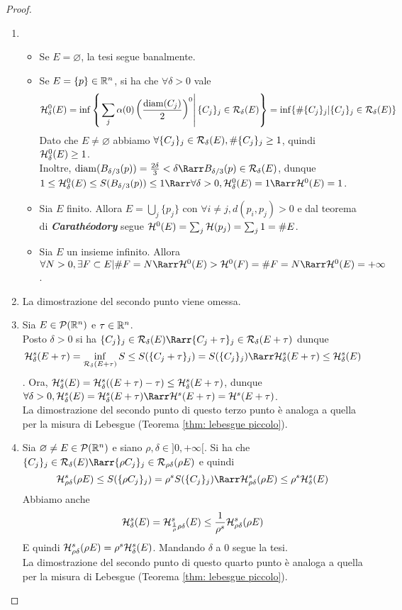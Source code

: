 \begin{proof}~
  \begin{enumerate}
      \item \begin{itemize}
          \item Se $E = \varnothing$, la tesi segue banalmente.
          \item Se $E = \{p\} \in \mathbb{R}^n$, si ha che $\forall \delta > 0$ vale \[\mathcal{H}_\delta^0(E) = \inf\left\{\left.\sum_j \alpha(0)\left(\frac{\operatorname{diam}(C_j)}{2}\right)^0\right|\{C_j\}_j \in \mathcal{R}_\delta(E)\right\} = \inf\{\#\{C_j\}_j |\{C_j\}_j \in \mathcal{R}_\delta(E)\}\] Dato che $E \neq \varnothing$ abbiamo $\forall \{C_j\}_j \in \mathcal{R}_\delta(E),\#\{C_j\}_j \geq 1$, quindi $\mathcal{H}_\delta^0(E) \geq 1$.\\ Inoltre, $\operatorname{diam}(B_{\delta/3}(p)) = \frac{2\delta}{3}<\delta \Rarr B_{\delta/3}(p) \in \mc R_\delta(E)$, dunque $1 \leq \mc H_\delta^0(E) \leq S(B_{\delta/3}(p)) \leq 1 \Rarr \forall \delta > 0 , \mc H_\delta^0(E) = 1 \Rarr \mc H^0(E) = 1$.
          \item Sia $E$ finito. Allora $E = \bigcup_j \{p_j\}$ con $\forall i \neq j, d(p_i,p_j) > 0$ e dal teorema di \textbf{\textit{Carathéodory}} segue $\mathcal{H}^0 (E) = \sum_j \mathcal{H}(p_j) = \sum_j 1 = \#E$.
          \item Sia $E$ un insieme infinito. Allora $\forall N > 0, \exists F \subset E | \#F = N \Rarr \mc H^0(E) > \mc H^0(F)=\#F=N \Rarr \mc H^0(E) = +\infty$.
      \end{itemize}
      \item La dimostrazione del secondo punto viene omessa.
      \item Sia $E \in \mathcal{P}(\mathbb{R}^n)$ e $\tau \in \mathbb{R}^n$. \\ Posto $\delta > 0$ si ha $\{C_j\}_j \in \mc R_\delta(E) \Rarr \{C_j+\tau\}_j \in \mc R_\delta(E+\tau)$ dunque \[\mc H_\delta^s(E+\tau) = \inf_{\mc R_\delta(E+\tau)}S \leq S(\{C_j+\tau\}_j) = S(\{C_j\}_j) \Rarr \mc H_\delta^s(E+\tau) \leq \mc H_\delta^s(E)\]. Ora, $\mathcal{H}_\delta^s(E) = \mathcal{H}_\delta^s((E+\tau)-\tau) \leq \mathcal{H}_\delta^s(E+\tau)$, dunque $\forall \delta > 0, \mc H_\delta^s(E)=\mc H_\delta^s(E+\tau)\Rarr \mc H^s(E+\tau) = \mc H^s(E+\tau)$. \\ La dimostrazione del secondo punto di questo terzo punto è  analoga a quella per la misura di Lebesgue (Teorema \ref{thm: lebesgue piccolo}).
      \item Sia $\varnothing \neq E \in \mathcal{P}(\mathbb{R}^n)$ e siano $\rho ,\delta \in ]0,+\infty[$. Si ha che $\{C_j\}_j \in \mc R_\delta(E) \Rarr \{\rho C_j\}_j \in \mc R_{\rho \delta}(\rho E)$ e quindi \[\mc H_{\rho \delta}^s(\rho E) \leq S(\{\rho C_j\}_j) = \rho ^sS(\{C_j\}_j) \Rarr \mc H_{\rho \delta}^s(\rho E) \leq \rho ^s \mc H_{\delta}^s(E)\] Abbiamo anche \[\mathcal{H}_{\delta}^s(E) = \mathcal{H}_{\frac{1}{\rho }\rho \delta}^s(E) \leq \frac{1}{\rho ^s}\mathcal{H}_{\rho \delta}^s(\rho E)\] E quindi $\mathcal{H}_{\rho \delta}^s(\rho E) = \rho ^s\mathcal{H}_{\delta}^s(E)$. Mandando $\delta$ a $0$ segue la tesi. \\ La dimostrazione del secondo punto di questo quarto punto è  analoga a quella per la misura di Lebesgue (Teorema \ref{thm: lebesgue piccolo}).

\end{enumerate}
\end{proof}
